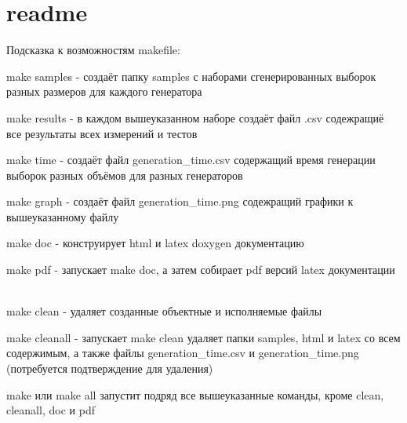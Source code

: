 \chapter{readme}
\hypertarget{md_readme}{}\label{md_readme}
Подсказка к возможностям makefile\+:


\begin{DoxyItemize}
\item {\ttfamily make samples} -\/ создаёт папку {\ttfamily samples} с наборами сгенерированных выборок разных размеров для каждого генератора
\item {\ttfamily make results} -\/ в каждом вышеуказанном наборе создаёт файл {\ttfamily .csv} содежращиё все результаты всех измерений и тестов
\item {\ttfamily make time} -\/ создаёт файл {\ttfamily generation\+\_\+time.\+csv} содержащий время генерации выборок разных объёмов для разных генераторов
\item {\ttfamily make graph} -\/ создаёт файл {\ttfamily generation\+\_\+time.\+png} содежращий графики к вышеуказанному файлу
\item {\ttfamily make doc} -\/ конструирует {\ttfamily html} и {\ttfamily latex} {\ttfamily doxygen} документацию
\item {\ttfamily make pdf} -\/ запускает {\ttfamily make doc}, а затем собирает {\ttfamily pdf} версий {\ttfamily latex} документации ~\newline

\item {\ttfamily make clean} -\/ удаляет созданные объектные и исполняемые файлы
\item {\ttfamily make cleanall} -\/ запускает {\ttfamily make clean} удаляет папки {\ttfamily samples}, {\ttfamily html} и {\ttfamily latex} со всем содержимым, а также файлы {\ttfamily generation\+\_\+time.\+csv} и {\ttfamily generation\+\_\+time.\+png} (потребуется подтверждение для удаления)
\item {\ttfamily make} или {\ttfamily make all} запустит подряд все вышеуказанные команды, кроме {\ttfamily clean}, {\ttfamily cleanall}, {\ttfamily doc} и {\ttfamily pdf} 
\end{DoxyItemize}